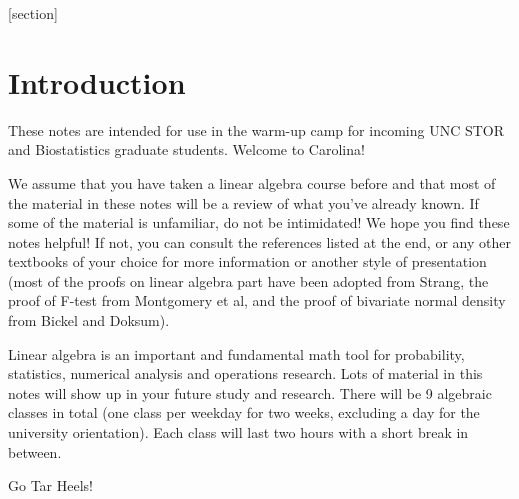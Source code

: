 \documentclass[12pt,oneside]{article}
\begin{document}
[section]

\makeatletter
\newenvironment{Assumptions}
  {\renewcommand\labelenumi{\bfseries (A\theenumi)}%
    \renewcommand\p@enumi{AMon}%
    \begin{enumerate}%
    \addtolength{\itemindent}{2.5em}
  }
  {\end{enumerate}}
\makeatother








\tableofcontents

\newpage

\section{Introduction}
These notes are intended for use in the warm-up camp for incoming
UNC STOR and Biostatistics graduate students. Welcome to Carolina!  

We assume that you have taken a linear algebra course before and that most of the material in these notes will be a review of what you've already known.  If some of the material is unfamiliar, do not be intimidated!  We hope you find these notes helpful! If not, you can consult the references listed at the end, or any other textbooks of your choice for more information or another style of presentation (most of the proofs on linear algebra part have been adopted from Strang, the proof of F-test from Montgomery et al, and the proof of bivariate normal density from Bickel and Doksum). 

Linear algebra is an important and fundamental math tool for probability, statistics, numerical analysis and operations research. Lots of material in this notes will show up in your future study and research. There will be 9 algebraic classes in total (one class per weekday for two weeks, excluding a day for the university orientation). Each class will last two hours with a short break in between.

Go Tar Heels!

\clearpage
\newpage
\end{document}
